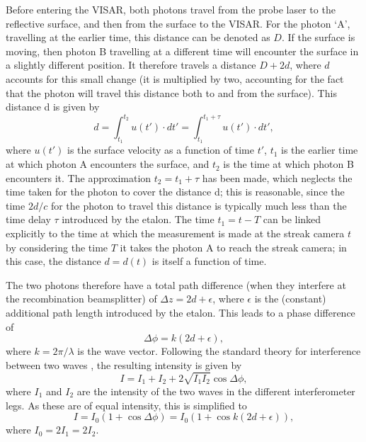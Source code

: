 Before entering the VISAR, both photons travel from the probe laser to the reflective surface, and then from the surface to the VISAR. For the photon `A', travelling at the earlier time, this distance can be denoted as $D$. If the surface is moving, then photon B travelling at a different time will encounter the surface in a slightly different position. It therefore travels a distance $D+2d$, where $d$ accounts for this small change (it is multiplied by two, accounting for the fact that the photon will travel this distance both to and from the surface). This distance d is given by \begin{equation} d = \int_{t_1}^{t_2} u(t') \cdot dt' = \int_{t_1}^{t_1 + \tau} u(t') \cdot dt',\end{equation} where $u(t')$ is the surface velocity as a function of time $t'$, $t_1$ is the earlier time at which photon A encounters the surface, and $t_2$ is the time at which photon B encounters it. The approximation $t_2 = t_1 + \tau$ has been made, which neglects the time taken for the photon to cover the distance d; this is reasonable, since the time $2d/c$ for the photon to travel this distance is typically much less than the time delay $\tau$ introduced by the etalon. The time $t_1 = t - T$ can be linked explicitly to the time at which the measurement is made at the streak camera $t$ by considering the time $T$ it takes the photon A to reach the streak camera; in this case, the distance $d = d(t)$ is itself a function of time.

The two photons therefore have a total path difference (when they interfere at the recombination beamsplitter) of $ \Delta z = 2d + \epsilon $, where $\epsilon$ is the (constant) additional path length introduced by the etalon. This leads to a phase difference of \begin{equation} \Delta\phi = k (2d + \epsilon),\end{equation} where $k = 2\pi / \lambda$ is the wave vector. Following the standard theory for interference between two waves \cite{Hecht2017}, the resulting intensity is given by  \begin{equation}I = I_1 + I_2 + 2\sqrt{I_1 I_2} \cos{\Delta \phi},\end{equation} where $I_1$ and $I_2$ are the intensity of the two waves in the different interferometer legs. As these are of equal intensity, this is simplified to \begin{equation} I = I_0 (1 + \cos{\Delta \phi}) = I_0 (1 + \cos{k (2d + \epsilon)}), \end{equation} where $I_0 = 2 I_1 = 2 I_2$.

